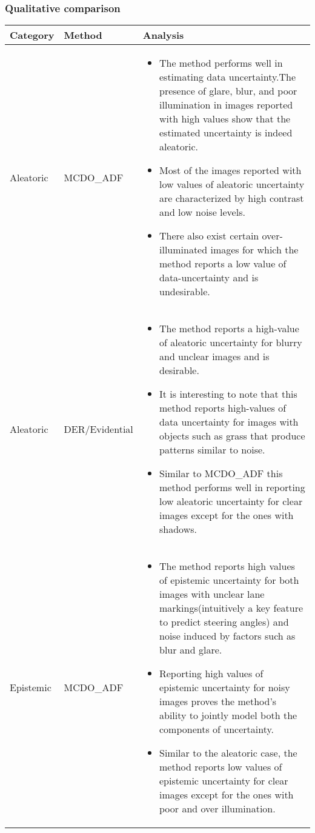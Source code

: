 \subsubsection{Qualitative comparison}
\begin{table}[H]
\begin{tabular}[h]{|p{1.5cm}|p{2.3cm}|p{12.5cm}|}
\hline
\textbf{Category}&\textbf{Method}&\textbf{Analysis}\\
\hline
Aleatoric&MCDO\_ADF&\begin{itemize}\item The method performs well in estimating data uncertainty.The presence of glare, blur, and poor illumination in images reported with high values show that the estimated uncertainty is indeed aleatoric. \item Most of the images reported with low values of aleatoric uncertainty are characterized by high contrast and low noise levels. \item There also exist certain over-illuminated images for which the method reports a low value of data-uncertainty and is undesirable.\end{itemize}\\
\hline
Aleatoric&DER/Evidential&\begin{itemize}\item The method reports a high-value of aleatoric uncertainty for blurry and unclear images and is desirable.\item  It is interesting to note that this method reports high-values of data uncertainty for images with objects such as grass that produce patterns similar to noise.\item Similar to MCDO\_ADF this method performs well in reporting low aleatoric uncertainty for clear images except for the ones with shadows.\end{itemize}\\
\hline
Epistemic&MCDO\_ADF&\begin{itemize}\item The method reports high values of epistemic uncertainty for both images with unclear lane markings(intuitively a key feature to predict steering angles) and noise induced by factors such as blur and glare.\item Reporting high values of epistemic uncertainty for noisy images proves the method's ability to jointly model both the components of uncertainty.\item Similar to the aleatoric case, the method reports low values of epistemic uncertainty for clear images except for the ones with poor and over illumination.\end{itemize}\\

\end{tabular}
\end{table}
